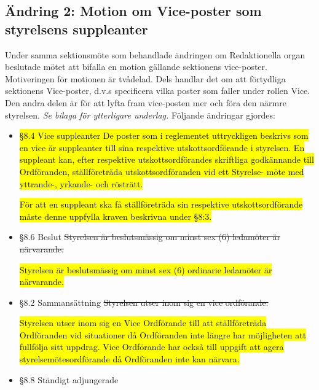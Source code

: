 \documentclass[10pt]{article}
\begin{document}
\subsection*{Ändring 2: Motion om Vice-poster som styrelsens suppleanter}
Under samma sektionsmöte som behandlade ändringen om Redaktionella organ beslutade mötet att bifalla en motion gällande sektionens vice-poster. Motiveringen för motionen är tvådelad. Dels handlar det om att förtydliga sektionens Vice-poster, d.v.s specificera vilka poster som faller under rollen Vice. Den andra delen är för att lyfta fram vice-posten mer och föra den närmre styrelsen. \textit{Se bilaga för ytterligare underlag.} Följande ändringar gjordes:
\begin{itemize}
    \item \hl{\S 8.4 Vice suppleanter De poster som i reglementet uttryckligen beskrivs som en vice är suppleanter till sina respektive utskottsordförande i styrelsen. En suppleant kan, efter respektive utskottsordförandes skriftliga godkännande till Ordföranden, ställföreträda utskottsordföranden vid ett Styrelse- möte med yttrande-, yrkande- och rösträtt.}

    \hl{För att en suppleant ska få ställföreträda sin respektive utskottsordförande måste denne uppfylla kraven beskrivna under \S8:3.}

    \item \S8.6 Beslut \sout{Styrelsen är beslutsmässig om minst sex (6) ledamöter är närvarande.}

    \hl{Styrelsen är beslutsmässig om minst sex (6) ordinarie ledamöter är närvarande.}

    \item \S8.2 Sammansättning \sout{Styrelsen utser inom sig en vice ordförande.}

    \hl{Styrelsen utser inom sig en Vice Ordförande till att ställföreträda Ordföranden vid situationer
    då Ordföranden inte längre har möjligheten att fullfölja sitt uppdrag. Vice Ordförande har
    också till uppgift att agera styrelsemötesordförande då Ordföranden inte kan närvara.}

    \item \S8.8 Ständigt adjungerade 


\end{itemize}
\end{document}
